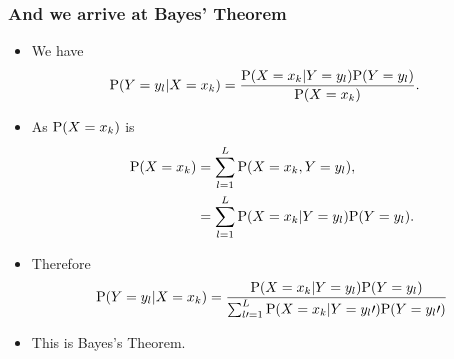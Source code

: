 \documentclass[10pt,xcolor=dvipsnames,serif,professionalfont]{beamer} %
\begin{document}
\begin{frame}
\frametitle{And we arrive at Bayes' Theorem}
\begin{itemize}
\item We have
\begin{align}
\mathrm{P}( Y=y_l \vert X=x_k ) &= \frac{\mathrm{P}( X=x_k\vert Y=y_l )\mathrm{P}( Y=y_l )}{\mathrm{P}( X=x_k )}.
\end{align}
\item As $\mathrm{P}( X=x_k )$ is
\begin{align}
\mathrm{P}( X=x_k ) &= \sum_{l=1}^L \mathrm{P}( X=x_k, Y=y_l  ),\\
 &= \sum_{l=1}^L \mathrm{P}( X=x_k \vert Y=y_l  )\mathrm{P}( Y=y_l ).
\end{align}
\item Therefore
\begin{equation*}
\mathrm{P}( Y=y_l \vert X=x_k ) = \frac{\mathrm{P}( X=x_k\vert Y=y_l )\mathrm{P}( Y=y_l )}{\sum_{l\prime=1}^L \mathrm{P}( X=x_k  \vert Y=y_l\prime )\mathrm{P}( Y=y_l\prime )}
\end{equation*}
\item This is Bayes's Theorem. 
\end{itemize}
\end{frame}
\end{document}
